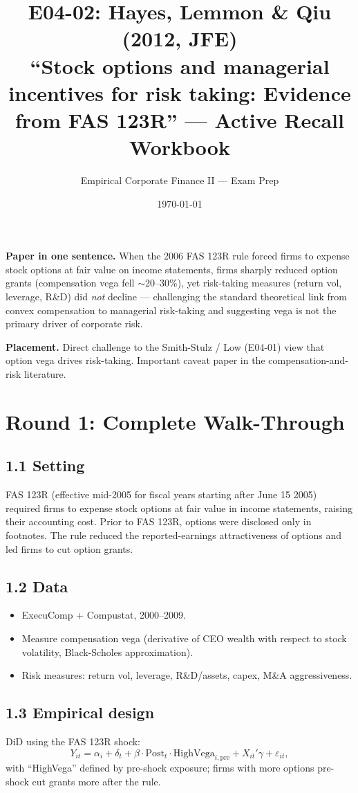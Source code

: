\documentclass[11pt]{article}
\title{E04-02: Hayes, Lemmon \& Qiu (2012, JFE) \\
\large ``Stock options and managerial incentives for risk taking: Evidence from FAS 123R'' --- Active Recall Workbook}
\author{Empirical Corporate Finance II --- Exam Prep}
\date{\today}
\begin{document}
\maketitle

\begin{keybox}
\textbf{Paper in one sentence.} When the 2006 FAS 123R rule forced firms to expense stock options at fair value on income statements, firms sharply reduced option grants (compensation vega fell $\sim$20--30\%), yet risk-taking measures (return vol, leverage, R\&D) did \emph{not} decline --- challenging the standard theoretical link from convex compensation to managerial risk-taking and suggesting vega is not the primary driver of corporate risk.

\textbf{Placement.} Direct challenge to the Smith-Stulz / Low (E04-01) view that option vega drives risk-taking. Important caveat paper in the compensation-and-risk literature.
\end{keybox}

\section*{Round 1: Complete Walk-Through}

\subsection*{1.1 Setting}
FAS 123R (effective mid-2005 for fiscal years starting after June 15 2005) required firms to expense stock options at fair value in income statements, raising their accounting cost. Prior to FAS 123R, options were disclosed only in footnotes. The rule reduced the reported-earnings attractiveness of options and led firms to cut option grants.

\subsection*{1.2 Data}
\begin{itemize}
\item ExecuComp + Compustat, 2000--2009.
\item Measure compensation vega (derivative of CEO wealth with respect to stock volatility, Black-Scholes approximation).
\item Risk measures: return vol, leverage, R\&D/assets, capex, M\&A aggressiveness.
\end{itemize}

\subsection*{1.3 Empirical design}
DiD using the FAS 123R shock:
\[
Y_{it}=\alpha_i+\delta_t+\beta\cdot\text{Post}_t\cdot\text{HighVega}_{i,\text{pre}}+X_{it}'\gamma+\varepsilon_{it},
\]
with ``HighVega'' defined by pre-shock exposure; firms with more options pre-shock cut grants more after the rule.
\end{document}
